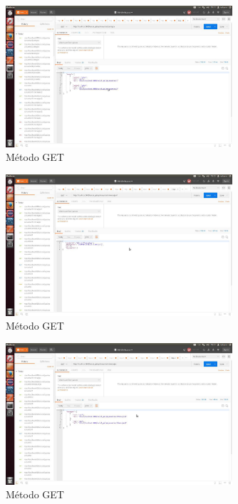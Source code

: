 \documentclass[12pt,a4paper, spanish]{article}
\begin{document}
\begin{figure}[H]
	\centering
	\includegraphics[width=0.75\textwidth]{images/captura6.jpg}
	\caption{Método GET}
\end{figure}

\begin{figure}[H]
	\centering
	\includegraphics[width=0.75\textwidth]{images/captura7.jpg}
	\caption{Método GET}
\end{figure}

\begin{figure}[H]
	\centering
	\includegraphics[width=0.75\textwidth]{images/captura8.jpg}
	\caption{Método GET}
\end{figure}
\end{document}
